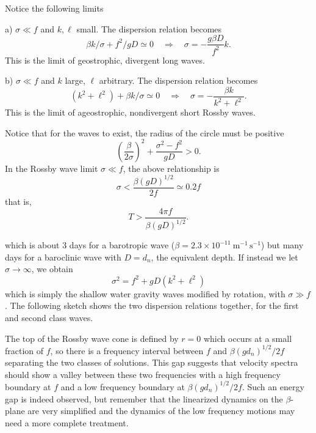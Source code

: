 Notice the following limits

\noindent a) $\sigma\ll f$ and $k,\ell$ small. The dispersion relation becomes
\[
	\beta k/\sigma+f^2/gD\simeq0
	\quad\Rightarrow\quad
	\sigma=-\frac{g\beta D}{f^2}k.
\]
This is the limit of geostrophic, divergent long waves.

\noindent b) $\sigma\ll f$ and $k$ large, $\ell$ arbitrary. The dispersion relation
becomes
\[
	(k^2+\ell^2)+\beta k/\sigma\simeq0
	\quad\Rightarrow\quad
	\sigma=-\frac{\beta k}{k^2+\ell^2}.
\]
This is the limit of ageostrophic, nondivergent short Rossby waves.

Notice that for the waves to exist, the radius of the circle must be positive
\[
	\left(\frac{\beta}{2\sigma}\right)^2
	+\frac{\sigma^2-f^2}{gD}>0.
\]
In the Rossby wave limit $\sigma\ll f$, the above relationship is
\[
	\sigma<\frac{\beta(gD)^{1/2}}{2f}\simeq0.2f
\]
that is,
\[
	T>\frac{4\pi f}{\beta(gD)^{1/2}}.
\]

\sourcepagebreak

which is about 3 days for a barotropic wave
($\beta=2.3\times10^{-11}\ \mathrm{m^{-1}\,s^{-1}}$) but many days for a baroclinic
wave with $D=d_n$, the equivalent depth. If instead we let $\sigma\to\infty$, we obtain
\[
	\sigma^2=f^2+gD(k^2+\ell^2)
\]
which is simply the shallow water gravity waves modified by rotation, with
$\sigma\gg f$. The following sketch shows the two dispersion relations together, for
the first and second class waves.


The top of the Rossby wave cone is defined by $r=0$ which occurs at a small fraction of
$f$, so there is a frequency interval between $f$ and
$\beta(gd_n)^{1/2}/2f$ separating the two classes of solutions. This gap suggests that
velocity spectra should show a valley between these two frequencies with a high
frequency boundary at $f$ and a low frequency boundary at
$\beta(gd_n)^{1/2}/2f$. Such an energy gap is indeed observed, but remember that the
linearized dynamics on the $\beta$-plane are very simplified and the dynamics of the
low frequency motions may need a more complete treatment.


